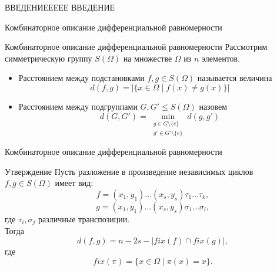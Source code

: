 \documentclass[11pt]{beamer}
\begin{document}



\begin{frame}{ВВЕДЕНИЕЕЕЕЕ}
ВВЕДЕНИЕ
\end{frame}


\begin{frame}{Комбинаторное описание дифференциальной равномерности}
\end{frame}






\begin{frame}{Комбинаторное описание дифференциальной равномерности}
Рассмотрим симметрическую группу $S(\Omega)$ на множестве $\Omega$ из $n$ элементов.
\begin{itemize}
\item Расстоянием между подстановками $f,g \in S(\Omega)$  называется величина $$d(f,g) = |\{ x \in \Omega \; | \; f(x) \neq g(x)\} |$$

\item Расстоянием между подгруппами $G,G' \leq S(\Omega)$ назовем $$d(G,G') = \min_{\substack{g \in G \setminus \{e\}  \\ g' \in G' \setminus \{e\}  }} d(g ,g')$$
\end{itemize}
\end{frame}

\begin{frame}{Комбинаторное описание дифференциальной равномерности}
\begin{block}{Утверждение}
Пусть разложение в произведение независимых циклов $f,g \in S(\Omega)$ имеет вид: $$f = (x_1, y_1) ... (x_s, y_s) \tau_1 ... \tau_k,$$ $$ g=(x_1,y_1) ... (x_s, y_s) \sigma_1 ... \sigma_l,$$  где  $\tau_i, \sigma_j$  различные транспозиции.\\
Тогда $$d(f,g) = n -2s - |fix(f) \cap fix(g)|,$$ 
где $$fix(\pi) = \{ x \in \Omega \; | \; \pi(x) = x \}.$$
\end{block}
\end{frame}
\end{document}
